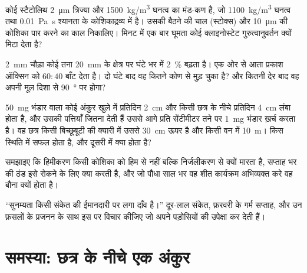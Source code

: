 \begin{exercise}[$\star\star$]\label{exo:b2:plant-plasticity:8}
कोई स्टैटोलिथ \qty{2}{\micro m} त्रिज्या और \qty{1500}{kg/m^3} घनत्व का
मंड-कण है, जो \qty{1100}{kg/m^3} घनत्व तथा
\qty{0.01}{Pa.s} श्यानता के कोशिकाद्रव्य में है। उसकी बैठने की चाल
(स्टोक्स) और \qty{10}{\micro m} की कोशिका पार करने का काल निकालिए। मिनट
में एक बार घूमता कोई क्लाइनोस्टेट गुरुत्वानुवर्तन क्यों मिटा देता है?
\end{exercise}

\begin{exercise}[$\star\star$]\label{exo:b2:plant-plasticity:9}
\qty{2}{mm} चौड़ा कोई तना \qty{20}{mm} के क्षेत्र पर घंटे भर में
\qty{2}{\%} बढ़ता है। एक ओर से आता प्रकाश ऑक्सिन को $60 : 40$ बाँट देता है।
दो घंटे बाद वह कितने कोण से मुड़ चुका है? और कितनी देर बाद वह अपनी
मूल दिशा से \qty{90}{\degree} पर होगा?
\end{exercise}

\begin{exercise}[$\star\star\star$]\label{exo:b2:plant-plasticity:10}
\qty{50}{mg} भंडार वाला कोई अंकुर खुले में प्रतिदिन \qty{2}{cm}
और किसी छत्र के नीचे प्रतिदिन \qty{4}{cm} लंबा होता है, और उसकी
पत्तियाँ जितना देती हैं उससे आगे प्रति सेंटीमीटर तने पर
\qty{1}{mg} भंडार ख़र्च करता है। वह छत्र किसी बिच्छूबूटी की क्यारी में
उससे \qty{30}{cm} ऊपर है और किसी वन में \qty{10}{m}। किस स्थिति में
 सफल होता है, और दूसरी में क्या होता है?
\end{exercise}

\begin{exercise}[$\star\star\star$]\label{exo:b2:plant-plasticity:11}
समझाइए कि हिमीकरण किसी कोशिका को हिम से नहीं बल्कि निर्जलीकरण से क्यों
मारता है, सप्ताह भर की ठंड इसे रोकने के लिए क्या करती है, और जो पौधा
साल भर वह शीत कार्यक्रम अभिव्यक्त करे वह बौना क्यों होता है।
\end{exercise}

\begin{exercise}[$\star\star\star$]\label{exo:b2:plant-plasticity:12}
``सुनम्यता किसी संकेत की ईमानदारी पर लगा दाँव है।'' दूर-लाल संकेत,
फ़रवरी के गर्म सप्ताह, और उन फ़सलों के प्रजनन के साथ इस पर विचार कीजिए
जो अपने पड़ोसियों की उपेक्षा कर देती हैं।
\end{exercise}

\section{समस्या: छत्र के नीचे एक अंकुर}

